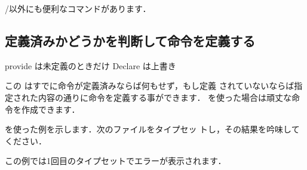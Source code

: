 /以外にも便利なコマンドがあります．


\subsection{定義済みかどうかを判断して命令を定義する}

provide は未定義のときだけ
Declare は上書き

この はすでに命令が定義済みならば何もせず，もし定義
されていないならば指定された内容の通りに命令を定義する事ができます．
を使った場合は頑丈な命令を作成できます．

 を使った例を示します．次のファイルをタイプセッ
 トし，その結果を吟味してください．


この例では1回目のタイプセットでエラーが表示されます．


